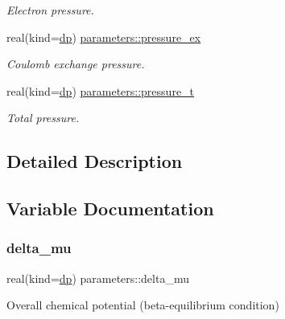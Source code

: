 \begin{DoxyCompactItemize}
\begin{DoxyCompactList}\small\item\em Electron pressure. \end{DoxyCompactList}\item 
real(kind=\mbox{\hyperlink{namespaceparameters_a52f8c6351fd79345d8811e065bcbbb37}{dp}}) \mbox{\hyperlink{group__WS__PROPERTIES_gab531cc7fbabd91f11cc2be7385cb5854}{parameters\+::pressure\+\_\+ex}}
\begin{DoxyCompactList}\small\item\em Coulomb exchange pressure. \end{DoxyCompactList}\item 
real(kind=\mbox{\hyperlink{namespaceparameters_a52f8c6351fd79345d8811e065bcbbb37}{dp}}) \mbox{\hyperlink{group__WS__PROPERTIES_gaf485019c788a68c4915fca156d59baa1}{parameters\+::pressure\+\_\+t}}
\begin{DoxyCompactList}\small\item\em Total pressure. \end{DoxyCompactList}\end{DoxyCompactItemize}


\subsection{Detailed Description}


\subsection{Variable Documentation}
\mbox{\label{group__WS__PROPERTIES_ga44464a0deab6ab30fe9c2301379ceb71}} 
\subsubsection{\texorpdfstring{delta\+\_\+mu}{delta\_mu}}
{\footnotesize\ttfamily real(kind=\mbox{\hyperlink{namespaceparameters_a52f8c6351fd79345d8811e065bcbbb37}{dp}}) parameters\+::delta\+\_\+mu}



Overall chemical potential (beta-\/equilibrium condition) 

